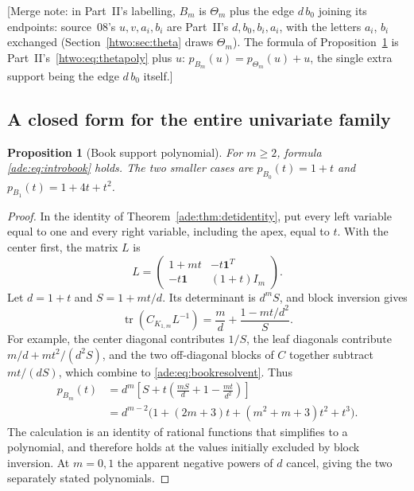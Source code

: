 \documentclass[11pt]{article}
\numberwithin{equation}{section}
\newtheorem{proposition}[theorem]{Proposition}
\theoremstyle{definition}
\newcommand{\one}{\mathbf 1}
\newcommand{\tr}{\operatorname{tr}}
\begin{document}
[Merge note: in Part~II's labelling, $B_m$ is $\Theta_m$ plus the edge
$d\,b_0$ joining its endpoints: source~08's $u,v,a_i,b_i$ are Part~II's
$d,b_0,b_i,a_i$, with the letters $a_i$, $b_i$ exchanged
(Section~\ref{htwo:sec:theta} draws $\Theta_m$). The formula of
Proposition~\ref{ade:prop:bookp} is Part~II's~\eqref{htwo:eq:thetapoly} plus
$u$: $p_{B_m}(u)=p_{\Theta_m}(u)+u$, the single extra support being the edge
$d\,b_0$ itself.]

\subsection{A closed form for the entire univariate family}

\begin{proposition}[Book support polynomial]
\label{ade:prop:bookp}
For $m\ge2$, formula \eqref{ade:eq:introbook} holds.  The two smaller cases are
$p_{B_0}(t)=1+t$ and $p_{B_1}(t)=1+4t+t^2$.
\end{proposition}
\begin{proof}
In the identity of Theorem~\ref{ade:thm:detidentity}, put every left variable
equal to one and every right variable, including the apex, equal to $t$.
With the center first, the matrix $L$ is
\begin{equation}
 L=
 \begin{pmatrix}
 1+mt&-t\one^T\\
 -t\one&(1+t)I_m
 \end{pmatrix}.
 \label{ade:eq:bookL}
\end{equation}
Let $d=1+t$ and $S=1+mt/d$.  Its determinant is $d^mS$, and block
inversion gives
\begin{equation}
 \tr(C_{K_{1,m}}L^{-1})
 =\frac m d+\frac{1-mt/d^2}{S}.
 \label{ade:eq:bookresolvent}
\end{equation}
For example, the center diagonal contributes $1/S$, the leaf diagonals
contribute $m/d+mt^2/(d^2S)$, and the two off-diagonal blocks of $C$
together subtract $mt/(dS)$, which combine to
\eqref{ade:eq:bookresolvent}.  Thus
\begin{align*}
 p_{B_m}(t)
 &=d^m\left[S+t\left(\frac{mS}{d}+1-\frac{mt}{d^2}\right)\right]\\
 &=d^{m-2}\bigl(1+(2m+3)t+(m^2+m+3)t^2+t^3\bigr).
\end{align*}
The calculation is an identity of rational functions that simplifies to
a polynomial, and therefore holds at the values initially excluded by
block inversion.  At $m=0,1$ the apparent negative powers of $d$ cancel,
giving the two separately stated polynomials.
\end{proof}
\end{document}
